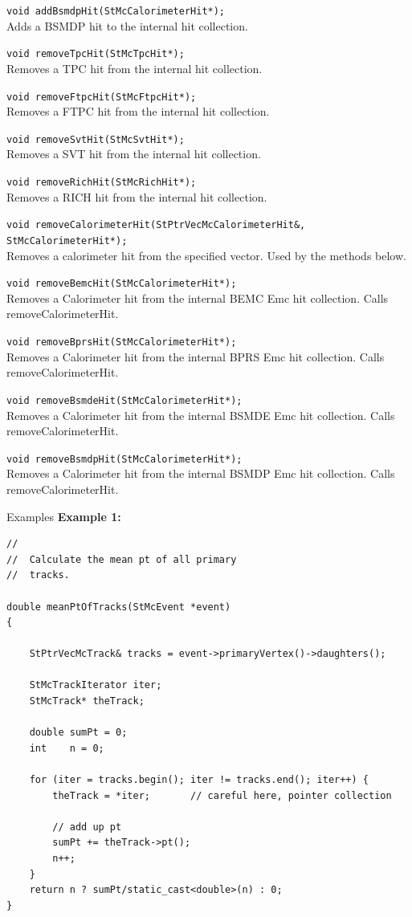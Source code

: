 \begin{Entry}
    \verb+void addBsmdpHit(StMcCalorimeterHit*);+\\
    Adds a BSMDP hit to the internal hit collection.

    \verb+void removeTpcHit(StMcTpcHit*);+\\
    Removes a TPC hit from the internal hit collection.

    \verb+void removeFtpcHit(StMcFtpcHit*);+\\
    Removes a FTPC hit from the internal hit collection.

    \verb+void removeSvtHit(StMcSvtHit*);+\\
    Removes a SVT hit from the internal hit collection.

    \verb+void removeRichHit(StMcRichHit*);+\\
    Removes a RICH hit from the internal hit collection.

    \verb+void removeCalorimeterHit(StPtrVecMcCalorimeterHit&, StMcCalorimeterHit*);+\\
    Removes a calorimeter hit from the specified vector. Used by the methods below.

    \verb+void removeBemcHit(StMcCalorimeterHit*);+\\
    Removes a Calorimeter hit from the internal BEMC Emc hit collection.  Calls
    removeCalorimeterHit.

    \verb+void removeBprsHit(StMcCalorimeterHit*);+\\
    Removes a Calorimeter hit from the internal BPRS Emc hit collection.  Calls
    removeCalorimeterHit.

    \verb+void removeBsmdeHit(StMcCalorimeterHit*);+\\
    Removes a Calorimeter hit from the internal BSMDE Emc hit collection.  Calls
    removeCalorimeterHit.

    \verb+void removeBsmdpHit(StMcCalorimeterHit*);+\\
    Removes a Calorimeter hit from the internal BSMDP Emc hit collection.  Calls
    removeCalorimeterHit.

\item[Examples]
{\bf Example 1:}
{\footnotesize
\begin{verbatim}
//
//  Calculate the mean pt of all primary
//  tracks.

double meanPtOfTracks(StMcEvent *event)
{
    
    StPtrVecMcTrack& tracks = event->primaryVertex()->daughters();

    StMcTrackIterator iter;
    StMcTrack* theTrack;

    double sumPt = 0;
    int    n = 0;

    for (iter = tracks.begin(); iter != tracks.end(); iter++) {
        theTrack = *iter;       // careful here, pointer collection

        // add up pt
        sumPt += theTrack->pt();
        n++;
    }
    return n ? sumPt/static_cast<double>(n) : 0;
}
\end{verbatim}
}%

\end{Entry}
